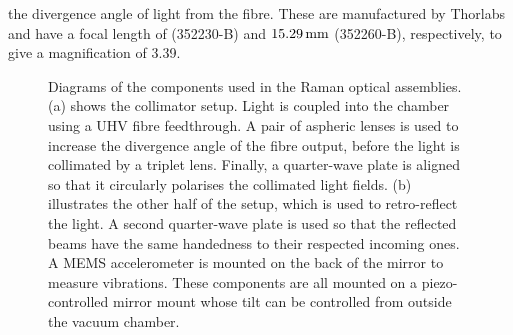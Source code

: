 the divergence angle of light from the fibre. These are manufactured by Thorlabs
and have a focal length of  (352230-B) and
\(\sivalue{15.29}{\milli\metre}\) (352260-B), respectively, to give a
magnification of 3.39.
\begin{figure}[!htbp]
	\centering
	\def\svgwidth{\columnwidth}
	\subfloat[][]{\scalebox{0.4}{\label{fig:raman_collimator}}}
	\subfloat[][]{\scalebox{0.4}{\label{fig:mirror_mount}}}
	\caption[Drawings of the componets used in the Raman optics
		assemblies]{Diagrams of the components used in the Raman optical assemblies.
		(a) shows the collimator setup. Light is coupled into the chamber using a
		UHV fibre feedthrough. A pair of aspheric lenses is used to increase the
		divergence angle of the fibre output, before the light is collimated by a
		triplet lens. Finally, a quarter-wave plate is aligned so that it circularly
		polarises the collimated light fields. (b) illustrates the other half of the
		setup, which is used to retro-reflect the light. A second quarter-wave plate
		is used so that the reflected beams have the same handedness to their
		respected incoming ones. A MEMS accelerometer is mounted on the back of the
		mirror to measure vibrations. These components are all mounted on a
		piezo-controlled mirror mount whose tilt can be controlled from outside the
		vacuum chamber.}
	\label{fig:raman_optics}
\end{figure}
